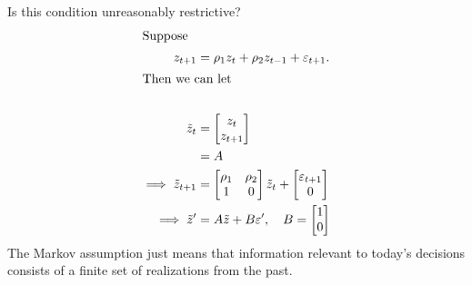 \documentclass[11pt]{article}
\begin{document}
Is this condition unreasonably restrictive?
\begin{align*}
\intertext{Suppose}
z_{t + 1} &= \rho_1 z_t + \rho_2 z_{t - 1} + \varepsilon_{t + 1}.\\
\intertext{Then we can let}\\
\tilde{z}_t &= \begin{bmatrix}z_t\\z_{t + 1}\end{bmatrix}\\
&= A\\
\implies \tilde{z}_{t + 1} &= \begin{bmatrix}\rho_1 & \rho_2 \\ 1 & 0\end{bmatrix} \tilde{z}_t + \begin{bmatrix}\varepsilon_{t + 1}\\ 0\end{bmatrix}\\
\implies \tilde{z}' &= A\tilde{z} + B \varepsilon', \quad B=\begin{bmatrix}1\\0\end{bmatrix}
\end{align*}
The Markov assumption just means that information relevant to today's decisions consists of a finite set of realizations from the past.
\end{document}
